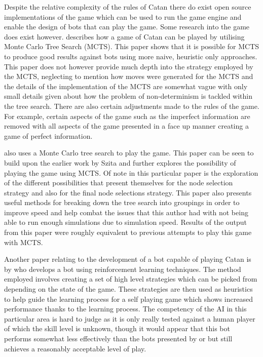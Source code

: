 \documentclass[]{article}
\begin{document}
\par Despite the relative complexity of the rules of Catan there do exist open source implementations of the game which can be used to run the game engine and enable the design of bots that can play the game. Some research into the game does exist however. \textcite{szita2009monte} describes how a game of Catan can be played by utilising Monte Carlo Tree Search (MCTS). This paper shows that it is possible for MCTS to produce good results against bots using more naive, heuristic only approaches. This paper does not however provide much depth into the strategy employed by the MCTS, neglecting to mention how moves were generated for the MCTS and the details of the implementation of the MCTS are somewhat vague with only small details given about how the problem of non-determinism is tackled within the tree search. There are also certain adjustments made to the rules of the game. For example, certain aspects of the game such as the imperfect information are removed with all aspects of the game presented in a face up manner creating a game of perfect information.

\par \textcite{roelofs2012monte} also uses a Monte Carlo tree search to play the game. This paper can be seen to build upon the earlier work by Szita and further explores the possibility of playing the game using MCTS. Of note in this particular paper is the exploration of the different possibilities that present themselves for the node selection strategy and also for the final node selections strategy. This paper also presents useful methods for breaking down the tree search into groupings in order to improve speed and help combat the issues that this author had with not being able to run enough simulations due to simulation speed. Results of the output from this paper were roughly equivalent to previous attempts to play this game with MCTS.

\par Another paper relating to the development of a bot capable of playing Catan is by \textcite{pfeiffer2004reinforcement} who develops a bot using reinforcement learning techniques. The method employed involves creating a set of high level strategies which can be picked from depending on the state of the game. These strategies are then used as heuristics to help guide the learning process for a self playing game which shows increased performance thanks to the learning process. The competency of the AI in this particular area is hard to judge as it is only really tested against a human player of which the skill level is unknown, though it would appear that this bot performs somewhat less effectively than the bots presented by \textcite{szita2009monte} or \textcite{roelofs2012monte} but still achieves a reasonably acceptable level of play.
\end{document}
